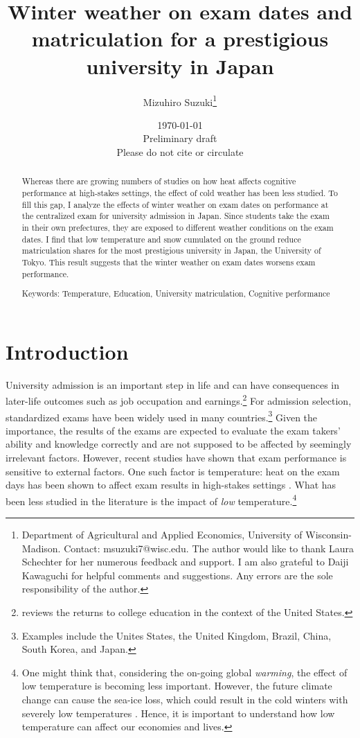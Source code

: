 \documentclass[12pt,letterpaper]{article}
\title{Winter weather on exam dates and matriculation for a prestigious university in Japan}%
\author{
  Mizuhiro Suzuki\thanks{
    Department of Agricultural and Applied Economics, University of Wisconsin-Madison.
    Contact: msuzuki7@wisc.edu.
    The author would like to thank Laura Schechter for her numerous feedback and support.
    I am also grateful to Daiji Kawaguchi for helpful comments and suggestions.
    Any errors are the sole responsibility of the author.
  }
}
\date{\today \\ \vspace{1cm} Preliminary draft \\ Please do not cite or circulate}
\begin{document}
  
\maketitle
\begin{abstract}
  \singlespacing
    \noindent 
    Whereas there are growing numbers of studies on how heat affects cognitive performance at high-stakes settings, the effect of cold weather has been less studied.
    To fill this gap, I analyze the effects of winter weather on exam dates on performance at the centralized exam for university admission in Japan.
    Since students take the exam in their own prefectures, they are exposed to different weather conditions on the exam dates. 
    I find that low temperature and snow cumulated on the ground reduce matriculation shares for the most prestigious university in Japan, the University of Tokyo.
    This result suggests that the winter weather on exam dates worsens exam performance. 

  \medskip
  \vspace{1cm}
  \noindent Keywords: Temperature, Education, University matriculation, Cognitive performance
\end{abstract}

\newpage

\section{Introduction}

University admission is an important step in life and can have consequences in later-life outcomes such as job occupation and earnings.\footnote{
  \citet{Hout2012} reviews the returns to college education in the context of the United States.
}
For admission selection, standardized exams have been widely used in many countries.\footnote{
  Examples include the Unites States, the United Kingdom, Brazil, China, South Korea, and Japan.
}
Given the importance, the results of the exams are expected to evaluate the exam takers' ability and knowledge correctly and are not supposed to be affected by seemingly irrelevant factors.
However, recent studies have shown that exam performance is sensitive to external factors.
One such factor is temperature:
heat on the exam days has been shown to affect exam results in high-stakes settings \citep{Park2020a, GraffZivin2020}.
What has been less studied in the literature is the impact of \textit{low} temperature.\footnote{
  One might think that, considering the on-going global \textit{warming}, the effect of low temperature is becoming less important.
  However, the future climate change can cause the sea-ice loss, which could result in the cold winters with severely low temperatures \citep{Kretschmer2016, Kim2014}.
  Hence, it is important to understand how low temperature can affect our economies and lives.
}
\end{document}
